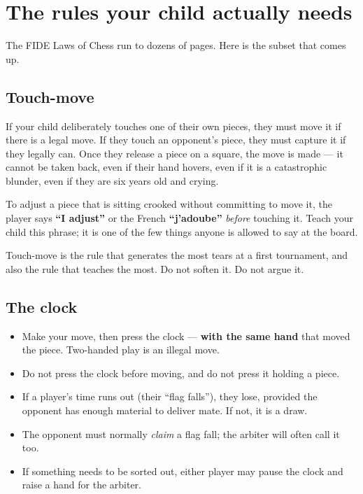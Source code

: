 \documentclass[10pt,letterpaper]{article}
\begin{document}
\section{The rules your child actually needs}

The FIDE Laws of Chess run to dozens of pages. Here is the subset that comes up.

\subsection{Touch-move}

If your child deliberately touches one of their own pieces, they must move it if
there is a legal move. If they touch an opponent's piece, they must capture it
if they legally can. Once they release a piece on a square, the move is made ---
it cannot be taken back, even if their hand hovers, even if it is a catastrophic
blunder, even if they are six years old and crying.

To adjust a piece that is sitting crooked without committing to move it, the
player says \textbf{``I adjust''} or the French \textbf{``j'adoube''}
\emph{before} touching it. Teach your child this phrase; it is one of the few
things anyone is allowed to say at the board.

Touch-move is the rule that generates the most tears at a first tournament, and
also the rule that teaches the most. Do not soften it. Do not argue it.

\subsection{The clock}

\begin{itemize}
  \item Make your move, then press the clock --- \textbf{with the same hand}
        that moved the piece. Two-handed play is an illegal move.
  \item Do not press the clock before moving, and do not press it holding a
        piece.
  \item If a player's time runs out (their ``flag falls''), they lose, provided
        the opponent has enough material to deliver mate. If not, it is a draw.
  \item The opponent must normally \emph{claim} a flag fall; the
        arbiter will often call it too.
  \item If something needs to be sorted out, either player may pause the clock
        and raise a hand for the arbiter.
\end{itemize}
\end{document}
